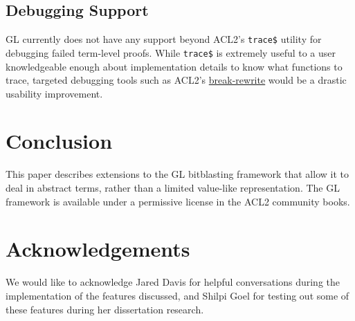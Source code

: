 \documentclass[submission,copyright,creativecommons]{eptcs}
\begin{document}
\subsection{Debugging Support}

GL currently does not have any support beyond ACL2's \texttt{trace\$}
utility for debugging failed term-level proofs.  While
\texttt{trace\$} is extremely useful to a user knowledgeable enough
about implementation details to know what functions to trace,
targeted debugging tools such as ACL2's 
\href{http://www.cs.utexas.edu/users/moore/acl2/manuals/current/manual/?topic=ACL2____BREAK-REWRITE}{break-rewrite}
would be a drastic usability improvement.

\section{Conclusion}
\label{sec:conclusion}

This paper describes extensions to the GL bitblasting framework that
allow it to deal in abstract terms, rather than a limited value-like
representation.  The GL framework is available under a permissive
license in the ACL2 community books.

\section*{Acknowledgements}
We would like to acknowledge Jared Davis for helpful conversations
during the implementation of the features discussed, and Shilpi Goel
for testing out some of these features during her dissertation
research.



\end{document}
